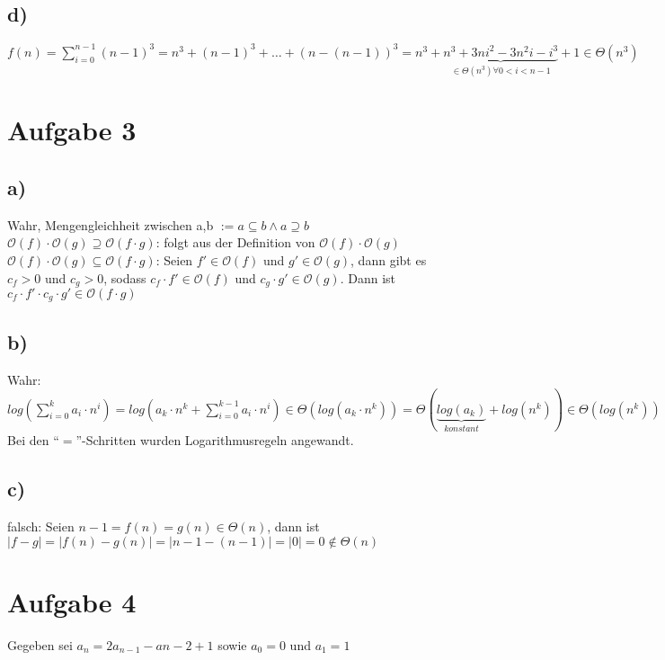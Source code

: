 \documentclass[a4paper,10pt,freqn]{article}
\begin{document}
\subsection*{d)}
$f(n) = \sum_{i=0}^{n-1} (n-1)^3 = n^3 + (n-1)^3 + \dots +(n-(n-1))^3 = n^3 + \underbrace{n^3 + 3ni^2 - 3n^2i - i^3}_{\in \Theta(n^3)\forall
0<i<n-1} + 1 \in \Theta(n^3)$

\section*{Aufgabe 3}
\subsection*{a)}
Wahr, Mengengleichheit zwischen a,b $:= a\subseteq b \wedge a\supseteq b$\newline
$\mathcal{O}(f)\cdot \mathcal{O}(g)\supseteq \mathcal{O}(f\cdot g)$: folgt aus der Definition von $\mathcal{O}(f)\cdot \mathcal{O}(g)$\newline
$\mathcal{O}(f)\cdot \mathcal{O}(g)\subseteq \mathcal{O}(f\cdot g)$: Seien $f'\in \mathcal{O}(f)$ und $g'\in \mathcal{O}(g)$,
dann gibt es $c_f>0$ und $c_g>0$, sodass $c_f\cdot f' \in  \mathcal{O}(f)$ und $c_g \cdot g' \in  \mathcal{O}(g)$.
Dann ist $c_f\cdot f' \cdot c_g \cdot g' \in  \mathcal{O}(f\cdot g)$

\subsection*{b)}
Wahr:\newline
$log(\sum_{i=0}^k a_i\cdot n^i) = log(a_k\cdot n^k + \sum_{i=0}^{k-1} a_i\cdot n^i) \in \Theta(log(a_k\cdot n^k)) = 
\Theta(\underbrace{log(a_k)}_{konstant}+log(n^k)) \in \Theta(log(n^k)) = \Theta(\underbrace{k}_{konstant}*log(n))
\in \Theta(log(n))$\newline Bei den ``$=$''-Schritten wurden Logarithmusregeln angewandt.

\subsection*{c)}
falsch:\newline
Seien $n-1 = f(n) = g(n) \in \Theta(n)$, dann ist $|f-g| = |f(n)-g(n)| = |n-1-(n-1)| = |0| = 0 \notin \Theta(n)$

\section{Aufgabe 4}
Gegeben sei $a_n = 2a_{n-1}-a{n-2} + 1$
sowie $a_0 = 0$ und $a_1 = 1$\\
\end{document}
